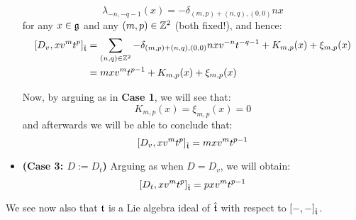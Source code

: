 \begin{remark}
\begin{itemize}
                        $$\lambda_{-n, -q - 1}(x) = -\delta_{(m, p) + (n, q), (0, 0)} n x$$
                    for any $x \in \mathfrak{g}$ and any $(m, p) \in \mathbb{Z}^2$ (both fixed!), and hence:
                        $$
                            \begin{aligned}
                                [D_v, x v^m t^p]_{\hat{\t}} & = \sum_{(n, q) \in \Z^2} -\delta_{(m, p) + (n, q), (0, 0)} n x v^{-n} t^{-q - 1} + K_{m, p}(x) + \xi_{m, p}(x)
                                \\
                                & = m x v^m t^{p - 1} + K_{m, p}(x) + \xi_{m, p}(x)
                            \end{aligned}
                        $$

                    Now, by arguing as in \textbf{Case 1}, we will see that:
                        $$K_{m, p}(x) = \xi_{m, p}(x) = 0$$
                    and afterwards we will be able to conclude that:
                        $$[D_v, x v^m t^p]_{\hat{\mathfrak{t}}} = m x v^m t^{p - 1}$$
                    \item \textbf{(Case 3: $D := D_t$)} Arguing as when $D = D_v$, we will obtain:
                        $$[D_t, x v^m t^p]_{\hat{\mathfrak{t}}} = p x v^m t^{p - 1}$$
                \end{itemize}
            \end{remark}
            \begin{remark}
                We see now also that $\mathfrak{t}$ is a Lie algebra ideal of $\hat{\mathfrak{t}}$ with respect to $[-, -]_{\hat{\mathfrak{t}}}$.
            \end{remark}


